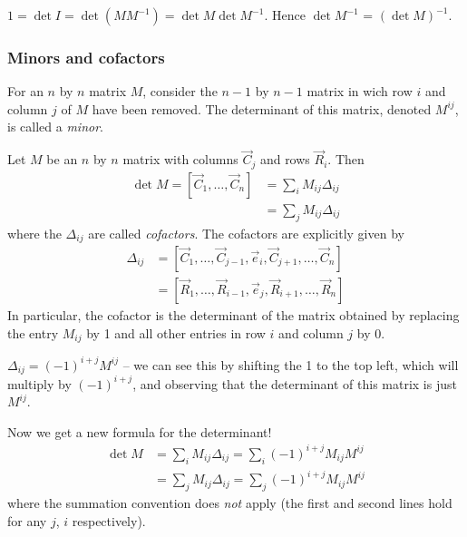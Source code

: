 \documentclass{../template/note}
\begin{document}
    \begin{corollary}
        \(1 = \det I = \det (MM^{-1}) = \det M \det M^{-1}\). Hence \(\det M^{-1}\) = \((\det M)^{-1}\).
    \end{corollary}
    
    \subsubsection{Minors and cofactors}

    \begin{definition}
        For an \(n\) by \(n\) matrix \(M\), consider the \(n-1\) by \(n-1\) matrix in wich row \(i\) and column \(j\) of \(M\) have been removed. The determinant of this matrix, denoted \(M^{ij}\), is called a \emph{minor}.
    \end{definition}
    
    \begin{definition}
        Let \(M\) be an \(n\) by \(n\) matrix with columns \(\vec C_j\) and rows \(\vec R_i\). Then
        \begin{align*}
            \det M = [\vec C_1, \dots, \vec C_n] &= \sum_{i} M_{ij} \Delta_{ij} \\
            &= \sum_j M_{ij} \Delta_{ij}
        \end{align*}
        where the \(\Delta_{ij}\) are called \emph{cofactors}. The cofactors are explicitly given by
        \begin{align*}
            \Delta_{ij} &= [\vec C_1, \dots, \vec C_{j-1}, \vec e_i, \vec C_{j+1}, \dots, \vec C_n] \\
            &= [\vec R_1, \dots, \vec R_{i-1}, \vec e_j, \vec R_{i+1}, \dots, \vec R_n]
        \end{align*}
        In particular, the cofactor is the determinant of the matrix obtained by replacing the entry \(M_{ij}\) by 1 and all other entries in row \(i\) and column \(j\) by 0.
    \end{definition}
    
    \begin{remark}
        \(\Delta_{ij} = (-1)^{i+j}M^{ij}\) -- we can see this by shifting the 1 to the top left, which will multiply by \((-1)^{i+j}\), and observing that the determinant of this matrix is just \(M^{ij}\).
    \end{remark}
    Now we get a new formula for the determinant!
    \begin{align*}
        \det M &= \sum_i M_{ij} \Delta_{ij} = \sum_i (-1)^{i+j} M_{ij} M^{ij} \\
        &= \sum_j M_{ij} \Delta_{ij} = \sum_j (-1)^{i+j} M_{ij} M^{ij}
    \end{align*}
    where the summation convention does \emph{not} apply (the first and second lines hold for any \(j\), \(i\) respectively).
\end{document}
